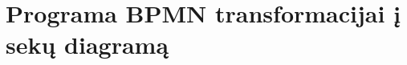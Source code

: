 \documentclass{VUMIFInfBakalaurinis}
\begin{document}
\section{Programa \textbf{BPMN} transformacijai į \textbf{sekų diagramą}}   





\printbibliography[heading=bibintoc] %


\appendix  %




\end{document}
